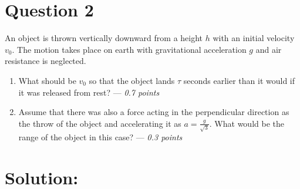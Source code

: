 \section*{Question 2}
An object is thrown vertically downward from a height $h$ with an initial velocity $v_0$. The motion takes place on earth with gravitational acceleration $g$ and air resistance is neglected.
\begin{enumerate}
    \item[(a)] What should be $v_0$ so that the object lands $\tau$ seconds earlier than it would if it was released from rest? --- \textit{0.7 points}
    \item[(b)] Assume that there was also a force acting in the perpendicular direction as the throw of the object and accelerating it as $a=\frac{g}{\sqrt{3}}$. What would be the range of the object in this case? --- \textit{0.3 points}
\end{enumerate}

\section*{Solution:}

